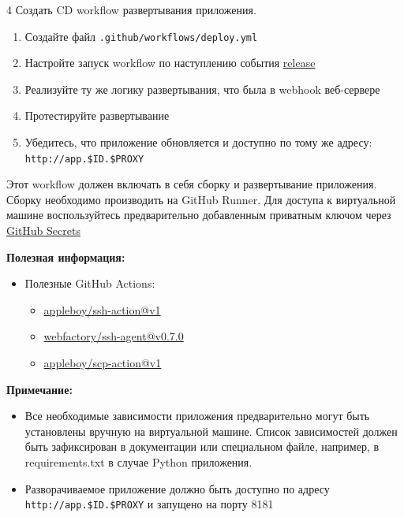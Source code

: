 \documentclass[12pt,a4paper]{article}
\begin{document}
\begin{task}{4}
    Создать CD workflow развертывания приложения.

    \begin{enumerate}
        \item Создайте файл \texttt{.github/workflows/deploy.yml}
        \item Настройте запуск workflow по наступлению события \href{https://docs.github.com/en/actions/reference/workflows-and-actions/events-that-trigger-workflows#release}{release}
        \item Реализуйте ту же логику развертывания, что была в webhook веб-сервере
        \item Протестируйте развертывание
        \item Убедитесь, что приложение обновляется и доступно по тому же адресу: \texttt{http://app.\$ID.\$PROXY}
    \end{enumerate}

    Этот workflow должен включать в себя сборку и развертывание приложения.
    Сборку необходимо производить на GitHub Runner.
    Для доступа к виртуальной машине воспользуйтесь предварительно добавленным приватным ключом через \href{https://docs.github.com/ru/actions/how-tos/write-workflows/choose-what-workflows-do/use-secrets}{GitHub Secrets}

    \textbf{Полезная информация:}
    \begin{itemize}
        \item Полезные GitHub Actions:
        \begin{itemize}
            \item \href{https://github.com/appleboy/ssh-action}{appleboy/ssh-action@v1}
            \item \href{https://github.com/webfactory/ssh-agent}{webfactory/ssh-agent@v0.7.0}
            \item \href{https://github.com/appleboy/scp-action}{appleboy/scp-action@v1}
        \end{itemize}
    \end{itemize}
    
    \textbf{Примечание:}
    \begin{itemize}
        \item Все необходимые зависимости приложения предварительно могут быть установлены вручную на виртуальной машине.
        Список зависимостей должен быть зафиксирован в документации или специальном файле, например, в requirements.txt в случае Python приложения.
        \item Разворачиваемое приложение должно быть доступно по адресу \texttt{http://app.\$ID.\$PROXY} и запущено на порту 8181
    \end{itemize}
\end{task}
\end{document}

